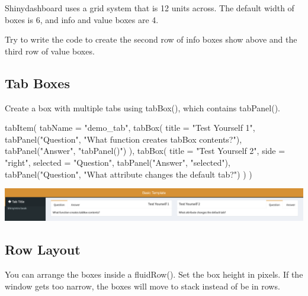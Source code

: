 \documentclass[
]{book}
\newenvironment{Shaded}{\begin{snugshade}}{\end{snugshade}}
\newcommand{\AttributeTok}[1]{\textcolor[rgb]{0.77,0.63,0.00}{#1}}
\newcommand{\FunctionTok}[1]{\textcolor[rgb]{0.00,0.00,0.00}{#1}}
\newcommand{\NormalTok}[1]{#1}
\newcommand{\StringTok}[1]{\textcolor[rgb]{0.31,0.60,0.02}{#1}}
\begin{document}
Shinydashboard uses a grid system that is 12 units across. The default width of boxes is 6, and info and value boxes are 4.

Try to write the code to create the second row of info boxes show above and the third row of value boxes.

\hypertarget{tab-boxes}{%
\subsection{Tab Boxes}\label{tab-boxes}}

Create a box with multiple tabs using tabBox(), which contains tabPanel().

\begin{Shaded}
\begin{Highlighting}[]
\FunctionTok{tabItem}\NormalTok{(}
    \AttributeTok{tabName =} \StringTok{"demo\_tab"}\NormalTok{,}
    \FunctionTok{tabBox}\NormalTok{(}
        \AttributeTok{title =} \StringTok{"Test Yourself 1"}\NormalTok{,}
        \FunctionTok{tabPanel}\NormalTok{(}\StringTok{"Question"}\NormalTok{, }\StringTok{"What function creates tabBox contents?"}\NormalTok{),}
        \FunctionTok{tabPanel}\NormalTok{(}\StringTok{"Answer"}\NormalTok{, }\StringTok{"tabPanel()"}\NormalTok{)}
\NormalTok{    ),}
    \FunctionTok{tabBox}\NormalTok{(}
        \AttributeTok{title =} \StringTok{"Test Yourself 2"}\NormalTok{,}
        \AttributeTok{side =} \StringTok{"right"}\NormalTok{,}
        \AttributeTok{selected =} \StringTok{"Question"}\NormalTok{,}
        \FunctionTok{tabPanel}\NormalTok{(}\StringTok{"Answer"}\NormalTok{, }\StringTok{"selected"}\NormalTok{),}
        \FunctionTok{tabPanel}\NormalTok{(}\StringTok{"Question"}\NormalTok{, }\StringTok{"What attribute changes the default tab?"}\NormalTok{)}
\NormalTok{    )}
\NormalTok{)}
\end{Highlighting}
\end{Shaded}

\includegraphics{images/sdb_tab_box.png}

\hypertarget{row-layout}{%
\subsection{Row Layout}\label{row-layout}}

You can arrange the boxes inside a fluidRow(). Set the box height in pixels. If the window gets too narrow, the boxes will move to stack instead of be in rows.
\end{document}
